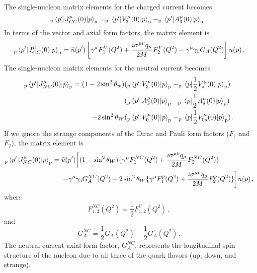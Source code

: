   The single-nucleon matrix elements for the charged current becomes
  \begin{equation}
     _{\textrm{p}}\mel{p'}{J^{\mu}_{CC}(0)}{p}_{\textrm{n}} 
       = _{\textrm{p}}\mel{p'}{V^{\mu}_3(0)}{p}_{\textrm{n}}
       - _{\textrm{p}}\mel{p'}{A^{\mu}_3(0)}{p}_{\textrm{n}} \,.
  \end{equation}
  In terms of the vector and axial form factors, the matrix element is
  \begin{equation}
     _{\textrm{p}}\mel{p'}{J^{\mu}_{CC}(0)}{p}_{\textrm{n}}
       = \bar{u}(p')\left[\gamma^{\mu} F_1^V(Q^2)
          + \frac{i\sigma^{\mu\nu}q_{\mu}}{2M} F_2^V(Q^2)
          - \gamma^{\mu}\gamma_5G_A(Q^2) \right] u(p) \,.
  \end{equation}
  The single-nucleon matrix elements for the neutral current becomes
  \begin{equation}
    \begin{aligned}
      _{\textrm{p}}\mel{p'}{J^{\mu}_{NC}(0)}{p}_{\textrm{p}} 
       = (1-2\sin^2\theta_w)&(_{\textrm{p}}\mel{p'}{V^{\mu}_3(0)}{p}_{\textrm{p}}
        - _{\textrm{p}}\mel{p}{\frac{1}{2}V^{\mu}_s(0)}{p}_{\textrm{p}}) \\
       - &(_{\textrm{p}}\mel{p'}{A^{\mu}_3(0)}{p}_{\textrm{p}}
        - _{\textrm{p}}\mel{p}{\frac{1}{2}A^{\mu}_s(0)}{p}_{\textrm{p}}) \\
       - 2\sin^2\theta_W&(_{\textrm{p}}\mel{p'}{V^{\mu}_0(0)}{p}_{\textrm{p}}
        - _{\textrm{p}}\mel{p}{\frac{1}{2}V^{\mu}_{0s}(0)}{p}_{\textrm{p}}) \,.
    \end{aligned}
  \end{equation}
  If we ignore the strange components of the Dirac and Pauli form factors
  ($F_1$ and $F_2$), the matrix element is
  \begin{equation}\label{eq:nucmatel}
    \begin{aligned}
     _{\textrm{p}}\mel{p'}{J^{\mu}_{NC}(0)}{p}_{\textrm{p}}
       = \bar{u}(p')&\bigg[(1-\sin^2\theta_W)\{\gamma^{\mu}F_1^{NC}(Q^2)
          + \frac{i\sigma^{\mu\nu}q_{\mu}}{2M}F_2^{NC}(Q^2)\}  \\
          - \gamma^{\mu}&\gamma_5 G_A^{NC}(Q^2)
          - 2\sin^2\theta_W\{\gamma^{\mu}F_1^p(Q^2) 
          + \frac{i\sigma^{\mu\nu}q_{\mu}}{2M}F_2^p(Q^2)\} \bigg]u(p) \,,
    \end{aligned}
  \end{equation}
  where
  \begin{equation}
    F_{1,2}^{NC}(Q^2) = \frac{1}{2}F_{1,2}^V(Q^2) \,,
  \end{equation}
  and
  \begin{equation}
    G_A^{NC} = \frac{1}{2}G_A(Q^2) - \frac{1}{2}G_A^s(Q^2) \,.
  \end{equation}
  The neutral current axial form factor, $G_A^{NC}$, represents the
  longitudinal spin structure of the nucleon due to all three of the quark
  flavors (up, down, and strange).
  
